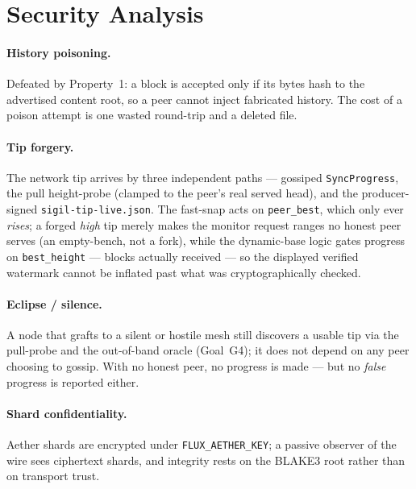\documentclass[11pt,a4paper]{article}
\newcommand{\code}[1]{\lstinline[basicstyle=\ttfamily\normalsize\color{codekw}]{#1}}
\begin{document}
\section{Security Analysis}

\paragraph{History poisoning.} Defeated by Property~1: a block is accepted only if
its bytes hash to the advertised content root, so a peer cannot inject fabricated
history. The cost of a poison attempt is one wasted round-trip and a deleted file.

\paragraph{Tip forgery.} The network tip arrives by three independent paths ---
gossiped \texttt{SyncProgress}, the pull height-probe (clamped to the peer's real
served head), and the producer-signed \texttt{sigil-tip-live.json}. The
fast-snap acts on \texttt{peer\_best}, which only ever \emph{rises}; a forged
\emph{high} tip merely makes the monitor request ranges no honest peer serves
(an empty-bench, not a fork), while the dynamic-base logic gates progress on
\code{best_height} --- blocks actually received --- so the displayed verified
watermark cannot be inflated past what was cryptographically checked.

\paragraph{Eclipse / silence.} A node that grafts to a silent or hostile mesh
still discovers a usable tip via the pull-probe and the out-of-band oracle
(Goal~G4); it does not depend on any peer choosing to gossip. With no honest
peer, no progress is made --- but no \emph{false} progress is reported either.

\paragraph{Shard confidentiality.} Aether shards are encrypted under
\texttt{FLUX\_AETHER\_KEY}; a passive observer of the wire sees ciphertext shards,
and integrity rests on the BLAKE3 root rather than on transport trust.

\end{document}
